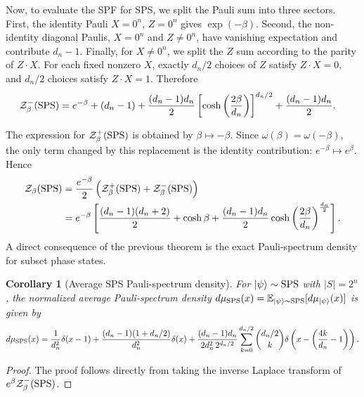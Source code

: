 \documentclass[aps,pra,superscriptaddress,twocolumn,longbibliography]{revtex4-2}
\newtheorem{corollary}{Corollary}
\begin{document}
Now, to evaluate the SPF for SPS, we split the Pauli sum into three sectors. First, the identity Pauli $X=0^n$, $Z=0^n$ gives $\exp(-\beta)$. Second, the non-identity diagonal Paulis, $X=0^n$ and $Z\neq0^n$, have vanishing expectation and contribute $d_n-1$. Finally, for $X\neq0^n$, we split the $Z$ sum according to the parity of $Z\cdot X$. For each fixed nonzero $X$, exactly $d_n/2$ choices of $Z$ satisfy $Z\cdot X=0$, and $d_n/2$ choices satisfy $Z\cdot X=1$. Therefore
\begin{align}
    \mathcal{Z}^{-}_{\beta}({\rm SPS})
    &=
    e^{-\beta}
    +(d_n-1)
    +
    \frac{(d_n-1)d_n}{2}
    \left[\cosh\left(\frac{2\beta}{d_n}\right)\right]^{d_n/2}
    +
    \frac{(d_n-1)d_n}{2}.
\end{align}

The expression for $\mathcal{Z}^{+}_{\beta}({\rm SPS})$ is obtained by
$\beta\mapsto-\beta$. Since $\omega(\beta)=\omega(-\beta)$, the only
term changed by this replacement is the identity contribution:
$e^{-\beta}\mapsto e^{\beta}$. Hence
%
\begin{align}
    \mathcal{Z}_{\beta}({\rm SPS})
    &=
    \frac{e^{-\beta}}{2}
    \left(
        \mathcal{Z}^{+}_{\beta}({\rm SPS})
        +
        \mathcal{Z}^{-}_{\beta}({\rm SPS})
    \right) \nonumber\\
    &=
    e^{-\beta}
    \left[ \frac{(d_{n}-1)(d_{n}+2)}{2}+\cosh\beta
    +\frac{(d_n-1)d_n}{2}
        \cosh{\left(\frac{2\beta}{d_{n}}\right)^{\frac{d_{n}}{2}}}
    \right].
\end{align}
%
A direct consequence of the previous theorem is the exact Pauli-spectrum density for subset phase states.

\begin{corollary}[Average SPS Pauli-spectrum density]
\label{App_corollary:SPS_Pauli_spectrum}
For $\ket{\psi}\sim{\rm SPS}$ with $|S|=2^n$, the normalized average Pauli-spectrum density $d\mu_{\rm SPS}(x)=\mathbb{E}_{\ket{\psi}\sim{\rm SPS}}
[d\mu_{\ket{\psi}}(x)]$ is given by
%
\begin{align}
    d\mu_{\rm SPS}(x)=\frac{1}{d_n^2}\delta(x-1) +
    \frac{(d_n-1)(1+d_n/2)}{d_n^2}\delta(x)+
    \frac{(d_n-1)d_n}{2d_n^2\,2^{d_n/2}}
    \sum_{k=0}^{d_n/2}\binom{d_n/2}{k}
\delta\left(x-\left(\frac{4k}{d_n}-1\right)\right).
\end{align}
%
\end{corollary}

\begin{proof}
The proof follows directly from taking the inverse Laplace transform of $e^{\beta}\mathcal{Z}_{\beta}^{-}(\rm SPS)$.
\end{proof}
\end{document}

